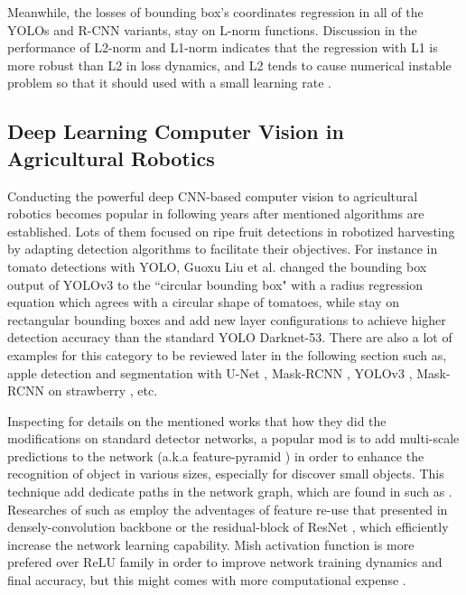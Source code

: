 \documentclass[default,pdflatex,iicol]{sn-jnl}%
\begin{document}
Meanwhile, the losses of bounding box's coordinates regression in all of the YOLOs and R-CNN variants, stay on L-norm functions. Discussion in the performance of L2-norm and L1-norm indicates that the regression with L1 is more robust than L2 in loss dynamics, and L2 tends to cause numerical instable problem so that it should used with a small learning rate \cite{fastrcnn}.

\subsection{Deep Learning Computer Vision in Agricultural Robotics}
Conducting the powerful deep CNN-based computer vision to agricultural robotics becomes popular in following years after mentioned algorithms are established. Lots of them focused on ripe fruit detections in robotized harvesting by adapting detection algorithms to facilitate their objectives. For instance in tomato detections with YOLO, Guoxu Liu et al. \cite{s20072145} changed the bounding box output of YOLOv3 to the ``circular bounding box" with a radius regression equation which agrees with a circular shape of tomatoes, while \cite{Lawal_2021, chentomato} stay on rectangular bounding boxes and add new layer configurations to achieve higher detection accuracy than the standard YOLO Darknet-53. There are also a lot of examples for this category to be reviewed later in the following section such as, apple detection and segmentation with U-Net \cite{Li2021apple}, Mask-RCNN \cite{Chu2021apple, Jia2020apple}, YOLOv3 \cite{Kuznetsova2020apple}, Mask-RCNN on strawberry \cite{Yu2019strawberry}, etc.

Inspecting for details on the mentioned works that how they did the modifications on standard detector networks, a popular mod is to add multi-scale predictions to the network (a.k.a feature-pyramid \cite{Tong2020}) in order to enhance the recognition of object in various sizes, especially for discover small objects. This technique add dedicate paths in the network graph, which are found in such as \cite{chentomato, Lawal_2021, Yu2019strawberry, Li2021apple}. Researches of such as \cite{Jia2020apple, Chu2021apple, Yu2019strawberry, Lawal2021tomato} employ the adventages of feature re-use that presented in densely-convolution backbone \cite{densenet} or the residual-block of ResNet \cite{resnet}, which efficiently increase the network learning capability. Mish activation function is more prefered over ReLU family in order to improve network training dynamics and final accuracy, but this might comes with more computational expense \cite{misra2019mish}.
\end{document}
